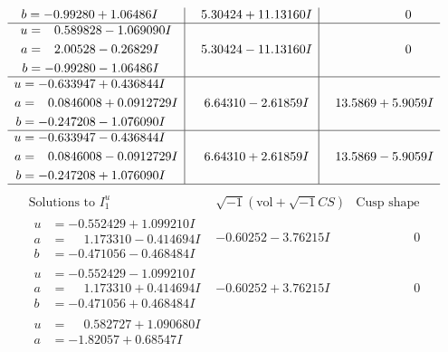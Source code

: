 \documentclass[1p]{elsarticle_modified}
\theoremstyle{definition}
\newcommand{\I}{\sqrt{-1}}
\begin{document}
$$\begin{array}{c|c|c}
\begin{aligned}
b &= -0.99280 + 1.06486 I\end{aligned}
 & \phantom{-}5.30424 + 11.13160 I & \phantom{-0.000000 } 0 \\ \hline\begin{aligned}
u &= \phantom{-}0.589828 - 1.069090 I \\
a &= \phantom{-}2.00528 - 0.26829 I \\
b &= -0.99280 - 1.06486 I\end{aligned}
 & \phantom{-}5.30424 - 11.13160 I & \phantom{-0.000000 } 0 \\ \hline\begin{aligned}
u &= -0.633947 + 0.436844 I \\
a &= \phantom{-}0.0846008 + 0.0912729 I \\
b &= -0.247208 - 1.076090 I\end{aligned}
 & \phantom{-}6.64310 - 2.61859 I & \phantom{-}13.5869 + 5.9059 I \\ \hline\begin{aligned}
u &= -0.633947 - 0.436844 I \\
a &= \phantom{-}0.0846008 - 0.0912729 I \\
b &= -0.247208 + 1.076090 I\end{aligned}
 & \phantom{-}6.64310 + 2.61859 I & \phantom{-}13.5869 - 5.9059 I\\
 \hline 
 \end{array}$$\newpage$$\begin{array}{c|c|c}  
\text{Solutions to }I^u_{1}& \I (\text{vol} + \sqrt{-1}CS) & \text{Cusp shape}\\
 \hline 
\begin{aligned}
u &= -0.552429 + 1.099210 I \\
a &= \phantom{-}1.173310 - 0.414694 I \\
b &= -0.471056 - 0.468484 I\end{aligned}
 & -0.60252 - 3.76215 I & \phantom{-0.000000 } 0 \\ \hline\begin{aligned}
u &= -0.552429 - 1.099210 I \\
a &= \phantom{-}1.173310 + 0.414694 I \\
b &= -0.471056 + 0.468484 I\end{aligned}
 & -0.60252 + 3.76215 I & \phantom{-0.000000 } 0 \\ \hline\begin{aligned}
u &= \phantom{-}0.582727 + 1.090680 I \\
a &= -1.82057 + 0.68547 I \\

\end{aligned}
\end{array}$$
\end{document}
